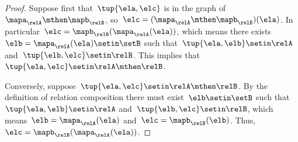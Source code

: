 \begin{proof}
    Suppose first that~$\tup{\ela, \elc}$ is in the graph of~$\mapa_{\relA} \mthen \mapb_{\relB}$, so~$\elc = (\mapa_{\relA} \mthen \mapb_{\relB})(\ela)$.
    In particular~$\elc = \mapb_{\relB}(\mapa_{\relA}(\ela))$, which means there exists~$\elb = \mapa_{\relA}(\ela) \setin \setB$ such that~$\tup{\ela, \elb} \setin \relA$ and~$\tup{\elb, \elc} \setin \relB$.
    This implies that~$\tup{\ela, \elc} \setin \relA \mthen \relB$.

    Conversely, suppose~$\tup{\ela, \elc} \setin \relA \mthen \relB$.
    By the definition of relation composition there must exist~$\elb \setin \setB$ such that~$\tup{\ela, \elb} \setin \relA$ and~$\tup{\elb, \elc} \setin \relB$, which means~$\elb = \mapa_{\relA}(\ela)$ and~$\elc = \mapb_{\relB}(\elb)$.
    Thus,~$\elc = \mapb_{\relB}(\mapa_{\relA}(\ela))$.
\end{proof}

